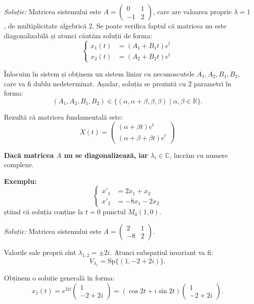 \documentclass[11pt,a4paper]{article}
\newcommand\RR{\mathbb{R}}
\newcommand\CC{\mathbb{C}}
\theoremstyle{dotless}
\theoremstyle{dotlessdr}
\begin{document}
\emph{Soluție:} Matricea sistemului este $A = \begin{pmatrix} 0 & 1 \\ -1 & 2 \end{pmatrix}$,
care are valoarea proprie $\lambda = 1$, de multiplicitate algebrică 2. Se poate verifica faptul
că matricea nu este diagonalizabilă și atunci căutăm soluții de forma:
\[
  \begin{cases}
    x_1(t) &= (A_1 + B_1 t) e^t \\
    x_2(t) &= (A_2 + B_2 t) e^t
  \end{cases}
\]

Înlocuim în sistem și obținem un sistem liniar cu necunoscutele $A_1, A_2, B_1, B_2$,
care va fi dublu nedeterminat. Așadar, soluția se prezintă cu 2 parametri în forma:
\[
  (A_1, A_2, B_1, B_2) \in \{ (\alpha, \alpha + \beta, \beta, \beta) \mid \alpha, \beta \in \RR \}.
\]

Rezultă că matricea fundamentală este:
\[
  X(t) = \begin{pmatrix}
    (\alpha + \beta t) e^t \\
    (\alpha + \beta + \beta t) e^t
  \end{pmatrix}
\]

\vspace{1cm}

\textbf{Dacă matricea $A$ nu se diagonalizează, iar $\lambda_i \in \CC$}, lucrăm cu numere complexe.

\textbf{Exemplu:}
\[
  \begin{cases}
    x'_1 &= 2x_1 + x_2 \\
    x'_2 &= -8x_1 - 2x_2
  \end{cases}
\]
știind că soluția conține la $t = 0$ punctul $M_0(1, 0)$.

\emph{Soluție:} Matricea sistemului este $A = \begin{pmatrix} 2 & 1 \\ -8 & 2 \end{pmatrix}$.

Valorile sale proprii sînt $\lambda_{1,2} = \pm 2i$. Atunci subspațiul invariant va fi:
\[
  V_{\lambda_1} = \mathrm{Sp} \{(1, -2 + 2i )\}.
\]

Obținem o soluție generală în forma:
\[
  x_1(t) = e^{2it} \begin{pmatrix} 1 \\ -2 + 2i \end{pmatrix} = %
  (\cos 2t + i \sin 2t) \begin{pmatrix} 1 \\ -2 + 2i \end{pmatrix}.
\]
\end{document}
